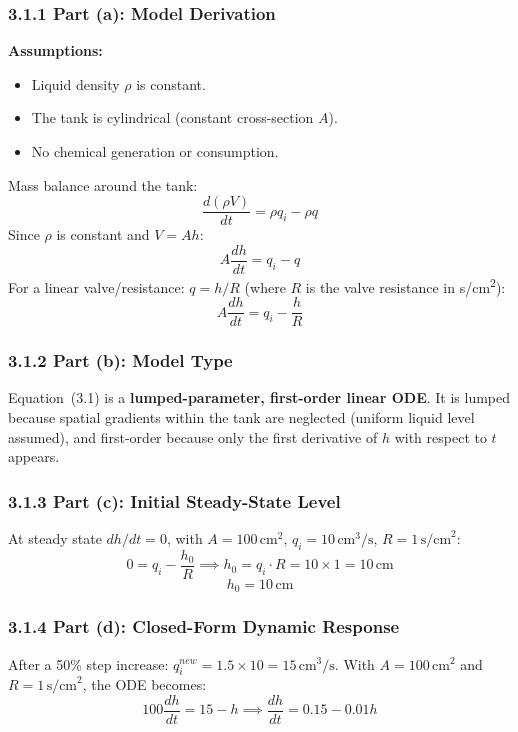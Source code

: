 \documentclass[12pt,a4paper]{article}
\begin{document}
\subsubsection{3.1.1 Part (a): Model Derivation}

\textbf{Assumptions:}
\begin{itemize}
  \item Liquid density $\rho$ is constant.
  \item The tank is cylindrical (constant cross-section $A$).
  \item No chemical generation or consumption.
\end{itemize}

Mass balance around the tank:
\[
\frac{d(\rho V)}{dt} = \rho q_i - \rho q
\]
Since $\rho$ is constant and $V = Ah$:
\[
A\frac{dh}{dt} = q_i - q
\]
For a linear valve/resistance: $q = h/R$ (where $R$ is the valve resistance in s/cm\textsuperscript{2}):
\[
\boxed{A\frac{dh}{dt} = q_i - \frac{h}{R}}
\tag{3.1}
\]

\subsubsection{3.1.2 Part (b): Model Type}

Equation~(3.1) is a \textbf{lumped-parameter, first-order linear ODE}. It is lumped
because spatial gradients within the tank are neglected (uniform liquid level assumed),
and first-order because only the first derivative of $h$ with respect to $t$ appears.

\subsubsection{3.1.3 Part (c): Initial Steady-State Level}

At steady state $dh/dt = 0$, with $A = 100\,\text{cm}^2$, $q_i = 10\,\text{cm}^3/\text{s}$, $R = 1\,\text{s/cm}^2$:
\[
0 = q_i - \frac{h_0}{R} \implies h_0 = q_i \cdot R = 10 \times 1 = 10\,\text{cm}
\]
\[
\boxed{h_0 = 10\,\text{cm}}
\]

\subsubsection{3.1.4 Part (d): Closed-Form Dynamic Response}

After a 50\% step increase: $q_i^{new} = 1.5 \times 10 = 15\,\text{cm}^3/\text{s}$.
With $A = 100\,\text{cm}^2$ and $R = 1\,\text{s/cm}^2$, the ODE becomes:
\[
100\frac{dh}{dt} = 15 - h \implies \frac{dh}{dt} = 0.15 - 0.01h
\tag{3.2}
\]
\end{document}
